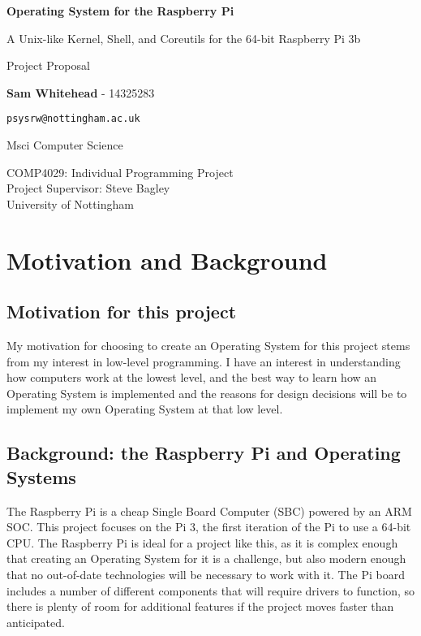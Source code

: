 \documentclass{article}
\begin{document}
\begin{titlepage}
    \begin{center}
        \null\mbox{}\vfill

        \vspace*{1cm}

        \huge
        \textbf{Operating System for the Raspberry Pi}

        \vspace{0.5cm}
        \Large
        A Unix-like Kernel, Shell, and Coreutils for the 64-bit Raspberry Pi 3b

        \large
        Project Proposal

        \Large

        \vspace{1.5cm}

        \textbf{Sam Whitehead} - 14325283

        \texttt{psysrw@nottingham.ac.uk}

        Msci Computer Science

        \vfill

        COMP4029: Individual Programming Project\\
        Project Supervisor: Steve Bagley\\
        University of Nottingham

        \vfill\null
    \end{center}
    \thispagestyle{empty}
\end{titlepage}

\section{Motivation and Background}

\subsection*{Motivation for this project}
My motivation for choosing to create an Operating System for this project stems
from my interest in low-level programming. I have an interest in understanding
how computers work at the lowest level, and the best way to learn how an
Operating System is implemented and the reasons for design decisions will be to
implement my own Operating System at that low level.

\subsection*{Background: the Raspberry Pi and Operating Systems}
The Raspberry Pi is a cheap Single Board Computer (SBC) powered by an ARM SOC.
This project focuses on the Pi 3, the first iteration of the Pi to use a 64-bit
CPU. The Raspberry Pi is ideal for a project like this, as it is complex enough
that creating an Operating System for it is a challenge, but also modern enough
that no out-of-date technologies will be necessary to work with it. The Pi
board includes a number of different components that will require drivers to
function, so there is plenty of room for additional features if the project
moves faster than anticipated.
\end{document}

